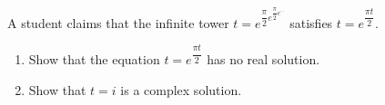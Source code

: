 A student claims that the infinite tower $t=e^{\dfrac\pi2e^{\dfrac\pi2e^{\cdots}}}$ satisfies $t=e^{\dfrac{\pi t}2}$.
\begin{enumerate}
\item[(a)] Show that the equation $t=e^{\dfrac{\pi t}2}$ has no real solution.
\item[(b)] Show that $t=i$ is a complex solution.
\end{enumerate}
